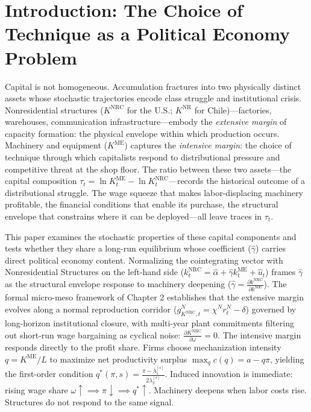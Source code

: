 \documentclass[11pt,a4paper]{article}
\begin{document}
\FloatBarrier
\section{Introduction: The Choice of Technique as a Political Economy Problem}

Capital is not homogeneous. Accumulation fractures into two physically distinct assets whose stochastic trajectories encode class struggle and institutional crisis. Nonresidential structures ($K^{\text{NRC}}$ for the U.S.; $K^{\text{NR}}$ for Chile)---factories, warehouses, communication infrastructure---embody the \textit{extensive margin} of capacity formation: the physical envelope within which production occurs. Machinery and equipment ($K^{\text{ME}}$) captures the \textit{intensive margin}: the choice of technique through which capitalists respond to distributional pressure and competitive threat at the shop floor. The ratio between these two assets---the capital composition $\tau_t = \ln K_t^{\text{ME}} - \ln K_t^{\text{NRC}}$---records the historical outcome of a distributional struggle. The wage squeeze that makes labor-displacing machinery profitable, the financial conditions that enable its purchase, the structural envelope that constrains where it can be deployed---all leave traces in $\tau_t$.

This paper examines the stochastic properties of these capital components and tests whether they share a long-run equilibrium whose coefficient ($\hat{\gamma}$) carries direct political economy content. Normalizing the cointegrating vector with Nonresidential Structures on the left-hand side ($k_t^{\text{NRC}} = \hat{\alpha} + \hat{\gamma} k_t^{\text{ME}} + \hat{u}_t$) frames $\hat{\gamma}$ as the structural envelope response to machinery deepening ($\hat{\gamma} = \frac{\partial k^{\text{NRC}}}{\partial k^{\text{ME}}}$). The formal micro-meso framework of Chapter 2 establishes that the extensive margin evolves along a normal reproduction corridor ($g_{K^{\text{NRC}},t}^N = \chi^N r_t^N - \delta$) governed by long-horizon institutional closure, with multi-year plant commitments filtering out short-run wage bargaining as cyclical noise: $\frac{\partial K^{\text{NRC}}}{\partial \omega} = 0$. The intensive margin responds directly to the profit share. Firms choose mechanization intensity $q = K^{\text{ME}}/L$ to maximize net productivity surplus $\max_q c(q) = a - q\pi$, yielding the first-order condition $q^*(\pi, s) = \frac{\pi - \lambda_1^{[s]}}{2\lambda_2^{[s]}}$. Induced innovation is immediate: rising wage share $\omega \uparrow \implies \pi \downarrow \implies q^* \uparrow$. Machinery deepens when labor costs rise. Structures do not respond to the same signal.
\end{document}
